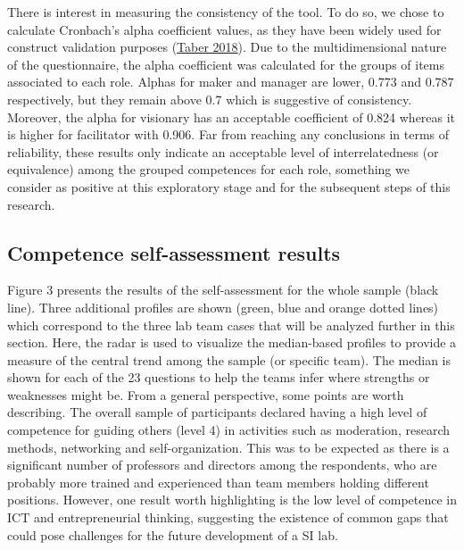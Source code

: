 \documentclass[AMA,STIX1COL,APA,STIX2COL]{WileyNJD-v2}
\begin{document}
There is interest in measuring the consistency of the tool. To do so, we
chose to calculate Cronbach's alpha coefficient values, as they have
been widely used for construct validation purposes
(\protect\hyperlink{ref-Taber2018}{Taber 2018}). Due to the
multidimensional nature of the questionnaire, the alpha coefficient was
calculated for the groups of items associated to each role. Alphas for
maker and manager are lower, 0.773 and 0.787 respectively, but they
remain above 0.7 which is suggestive of consistency. Moreover, the alpha
for visionary has an acceptable coefficient of 0.824 whereas it is
higher for facilitator with 0.906. Far from reaching any conclusions in
terms of reliability, these results only indicate an acceptable level of
interrelatedness (or equivalence) among the grouped competences for each
role, something we consider as positive at this exploratory stage and
for the subsequent steps of this research.

\hypertarget{competence-self-assessment-results}{%
\subsection{Competence self-assessment
results}\label{competence-self-assessment-results}}

Figure 3 presents the results of the self-assessment for the whole
sample (black line). Three additional profiles are shown (green, blue
and orange dotted lines) which correspond to the three lab team cases
that will be analyzed further in this section. Here, the radar is used
to visualize the median-based profiles to provide a measure of the
central trend among the sample (or specific team). The median is shown
for each of the 23 questions to help the teams infer where strengths or
weaknesses might be. From a general perspective, some points are worth
describing. The overall sample of participants declared having a high
level of competence for guiding others (level 4) in activities such as
moderation, research methods, networking and self-organization. This was
to be expected as there is a significant number of professors and
directors among the respondents, who are probably more trained and
experienced than team members holding different positions. However, one
result worth highlighting is the low level of competence in ICT and
entrepreneurial thinking, suggesting the existence of common gaps that
could pose challenges for the future development of a SI lab.
\end{document}
